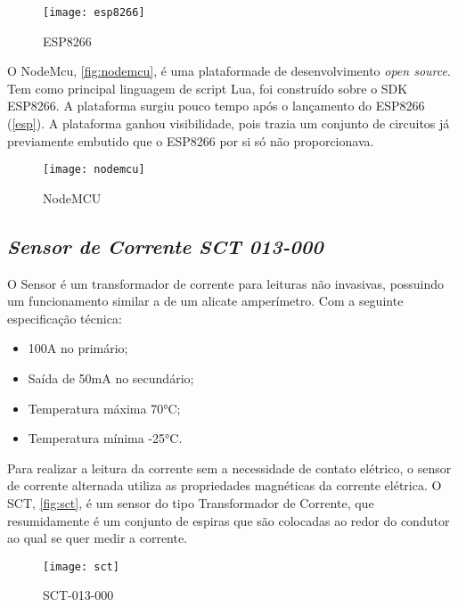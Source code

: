 \begin{figure}[h!]
	\texttt{[image: esp8266]}
	\centering
	\caption[ESP8266]{ESP8266}
	\label{fig:esp8266}
\end{figure}
\FloatBarrier

O NodeMcu, \autoref{fig:nodemcu}, é uma plataformade de desenvolvimento \textit{open source}. Tem como principal linguagem de script Lua, foi construído sobre o SDK ESP8266.
A plataforma surgiu pouco tempo após o lançamento do ESP8266 (\autoref{esp}). A plataforma ganhou visibilidade, pois trazia um conjunto
de circuitos já previamente embutido que o ESP8266 por si só não proporcionava.

\begin{figure}[h!]
	\texttt{[image: nodemcu]}
	\centering
	\caption[NodeMCU]{NodeMCU}
	\label{fig:nodemcu}
\end{figure}
\FloatBarrier

\subsection[\textit{Sensor de Corrente SCT 013-000}]{\textit{Sensor de Corrente SCT 013-000}}\label{sct}
O Sensor é um transformador de corrente para leituras não invasivas, possuindo um funcionamento similar a de um alicate amperímetro. Com a seguinte especificação
técnica: 
\begin{itemize}
	\item 100A no primário;
	\item Saída de 50mA no secundário;
	\item Temperatura máxima \ang{70}C;
	\item Temperatura mínima \ang{-25}C.
\end{itemize} 
Para realizar a leitura da corrente sem a necessidade de contato elétrico, o sensor de corrente alternada utiliza as propriedades 
magnéticas da corrente elétrica. O SCT, \autoref{fig:sct}, é um sensor do tipo Transformador de Corrente, que resumidamente é um conjunto de espiras que são
colocadas ao redor do condutor ao qual se quer medir a corrente. 

\begin{figure}[h!]
	\texttt{[image: sct]}
	\centering
	\caption[SCT-013-000]{SCT-013-000}
	\label{fig:sct}
\end{figure}
\FloatBarrier
